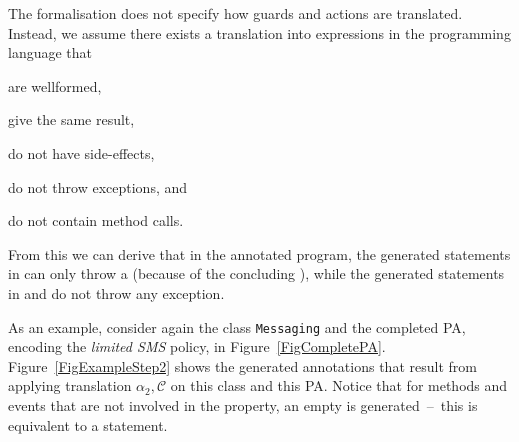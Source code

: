 The formalisation does not specify how guards and actions are
translated. Instead, we assume there exists a translation into
expressions in the programming language that
\begin{inparaenum}
\item are wellformed,
\item give the same result,
\item do not have side-effects,
\item do not throw exceptions, and
\item do not contain method calls.
\end{inparaenum}
From this we can derive that in the annotated program, the generated
statements in \preset can only throw a \JMLExc (because of the
concluding \Assert), while the generated statements in \postset
and \excset do not throw any exception.

As an example, consider again
the class \texttt{Messaging} and the completed
PA, encoding the \emph{limited SMS} policy, in
Figure~\ref{FigCompletePA}. Figure~\ref{FigExampleStep2} shows the
generated annotations that result from applying translation
\(\alpha_2,\mathcal{C}\) on this class and this PA. Notice that for methods
and events that are not involved in the property, an empty \CaseJML is
generated~--~this is equivalent to a
\Skip statement.

